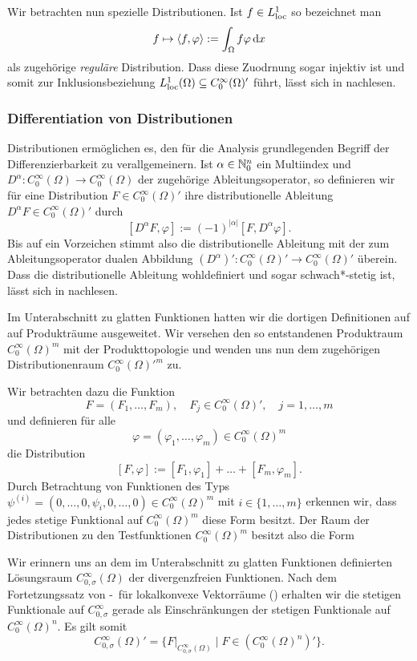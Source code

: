 Wir betrachten nun spezielle Distributionen.
Ist $f \in L^1_{\operatorname{loc}}$ so bezeichnet man 
$$
f \mapsto \langle f, \varphi \rangle := \int_\Omega f \varphi \, {\operatorname{d}\!{x}}
$$
als zugehörige \emph{reguläre} Distribution.
Dass diese Zuodrnung sogar injektiv ist und somit zur Inklusionsbeziehung $L^1_{\operatorname{loc}}(\Omega) \subseteq C^\infty_0(\Omega)'$ führt, lässt sich in \cite[S.432, Beispiel (a)]{werner2011fa} nachlesen.

\subsubsection{Differentiation von Distributionen}

Distributionen ermöglichen es, den für die Analysis grundlegenden Begriff der Differenzierbarkeit zu verallgemeinern.
Ist $\alpha \in \mathbb{N}_0^n$ ein Multiindex und $D^\alpha \colon C_0^\infty(\Omega) \to C_0^\infty(\Omega)$ der zugehörige Ableitungsoperator, so definieren wir für eine Distribution $F \in C_0^\infty(\Omega)'$ ihre distributionelle Ableitung $D^\alpha F \in C_0^\infty(\Omega)'$ durch
$$
  [D^\alpha F, \varphi] := (-1)^{|\alpha|} [F, D^\alpha \varphi].
$$
Bis auf ein Vorzeichen stimmt also die distributionelle Ableitung mit der zum Ableitungsoperator dualen Abbildung $(D^\alpha)' \colon C_0^\infty(\Omega)' \to C_0^\infty(\Omega)'$ überein.
Dass die distributionelle Ableitung wohldefiniert und sogar schwach*-stetig ist, lässt sich in \cite[S.434, Lemma VIII.5.7]{werner2011fa} nachlesen.

Im Unterabschnitt zu glatten Funktionen hatten wir die dortigen Definitionen auf auf Produkträume ausgeweitet.
Wir versehen den so entstandenen Produktraum $C_0^\infty(\Omega)^m$ mit der Produkttopologie und wenden uns nun dem zugehörigen Distributionenraum $C_0^\infty(\Omega)'^m$ zu.

Wir betrachten dazu die Funktion
$$
  F = (F_1, \dots, F_m), \quad F_j \in C_0^\infty(\Omega)', \quad j = 1, \dots, m
$$
und definieren für alle 
$$\varphi = (\varphi_1, \dots, \varphi_m) \in C_0^\infty(\Omega)^m$$
die Distribution
$$
[F, \varphi] := [F_1, \varphi_1] + \dots + [F_m, \varphi_m].
$$
Durch Betrachtung von Funktionen des Typs $\psi^{(i)} = (0, \dots,0, \psi_i, 0,\dots,0) \in C_0^\infty(\Omega)^m$ mit $i \in \{1,\dots,m\}$ erkennen wir, dass jedes stetige Funktional auf $C_0^\infty(\Omega)^m$ diese Form besitzt.
Der Raum der Distributionen zu den Testfunktionen $C_0^\infty(\Omega)^m$ besitzt also die Form

Wir erinnern uns an dem im Unterabschnitt zu glatten Funktionen definierten Lösungsraum $C_{0, \sigma}^\infty(\Omega)$ der divergenzfreien Funktionen.
Nach dem Fortetzungssatz von \hahn\hyp{}\banach\ für lokalkonvexe Vektorräume (\cite[S.408, Satz VIII.2.8]{werner2011fa}) erhalten wir die stetigen Funktionale auf $C_{0,\sigma}^\infty$ gerade als Einschränkungen der stetigen Funktionale auf $C_0^\infty(\Omega)^n$. Es gilt somit
$$
C_{0,\sigma}^\infty(\Omega)' = \{F|_{C_{0,\sigma}^\infty(\Omega)} \mid F \in (C_0^\infty(\Omega)^n)'\}.
$$

